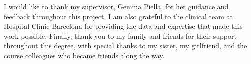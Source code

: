 
\begin{acknowledgement}

I would like to thank my supervisor, Gemma Piella, for her guidance and feedback throughout this project. I am also grateful to the clinical team at Hospital Cl\'inic Barcelona for providing the data and expertise that made this work possible. Finally, thank you to my family and friends for their support throughout this degree, with special thanks to my sister, my girlfriend, and the course colleagues who became friends along the way.

\newpage
\end{acknowledgement}